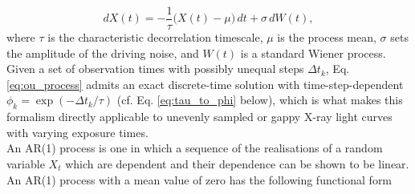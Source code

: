 \documentclass{aa}
\begin{document}
\begin{equation}
dX(t) = -\frac{1}{\tau}\big(X(t) - \mu\big)\,dt + \sigma\,dW(t),
\label{eq:ou_process}
\end{equation}
where $\tau$ is the characteristic decorrelation timescale, $\mu$ is the process mean, $\sigma$ sets the
amplitude of the driving noise, and $W(t)$ is a standard Wiener process. Given a set of observation times
with possibly unequal steps $\Delta t_k$, Eq. \ref{eq:ou_process} admits an exact discrete-time solution
with time-step-dependent $\phi_k = \exp(-\Delta t_k/\tau)$ (cf. Eq. \ref{eq:tau_to_phi} below), which is
what makes this formalism directly applicable to unevenly sampled or gappy X-ray light curves with
varying exposure times. \\
An AR(1) process is one in which a sequence of the realisations of a random variable ${X_t}$ which are
dependent and their dependence can be shown to be linear. An AR(1) process with a mean value of zero has
the following functional form
\end{document}
